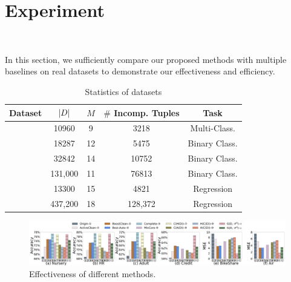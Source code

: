 
\section{Experiment}~\label{sec:exp}


In this section, we sufficiently compare our proposed methods with multiple baselines on real datasets to demonstrate our effectiveness and efficiency. 

\begin{table}
	\centering
	\caption{Statistics of datasets}
	\vspace{-1em}
	{\small
	\begin{tabular}{ccccc}
		\hline
		{\bf Dataset} & {\bf $|D|$} & {\bf $M$} & {\bf $\#$ Incomp. Tuples} & {\bf Task}\\
		\hline	
		\nursery & 	10960 & 9 & 3218 & Multi-Class. \\
		\hr & 18287 & 12 & 5475 & Binary Class. \\
		\adult & 32842 & 14 & 10752 & Binary Class. \\
		\credit & 131,000 & 11 & 76813 & Binary Class. \\
		\bike & 13300 & 15 & 4821 & Regression \\
		\air & 437,200  & 18 & 128,372 & Regression\\
		\hline
	\end{tabular}
	}
	\label{tbl:dataset}
\end{table}



\begin{figure}
	\centering
	\includegraphics[width=\textwidth]{figs/effectiveness_new.png}
	\caption{Effectiveness of different methods.}
	\label{fig:effectiveness}
\end{figure}


